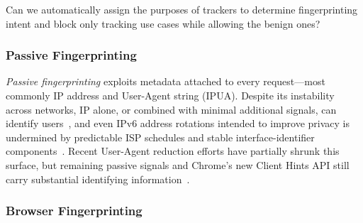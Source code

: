 \begin{opbox}
Can we automatically assign the purposes of trackers to determine fingerprinting intent and block only tracking use cases while allowing the benign ones?
\end{opbox}



\subsubsection{Passive Fingerprinting} 
\label{sec:stateless-techniques-passive-fingperinting}
%
\textit{Passive fingerprinting} exploits metadata attached to every request---most commonly IP address and User-Agent string (IPUA).
%
Despite its instability across networks, IP alone, or combined with minimal additional signals, can identify users~\cite{mishraDontCountMe2020,klineStructureCharacteristicsUser2017}, and even IPv6 address rotations intended to improve privacy is undermined by predictable ISP schedules and stable interface-identifier components~\cite{ryeFollowScentDefeating2021}.
%
Recent User-Agent reduction efforts have partially shrunk this surface, but remaining passive signals and Chrome's new Client Hints API still carry substantial identifying information~\cite{eckersleyHowUniqueYour2010,senolUnveilingImpactUserAgent2023,wieflingPrivacyMeasureTurned2024}.



\subsubsection{Browser Fingerprinting} 
\label{sec:stateless-techniques-browser-fingperinting}

